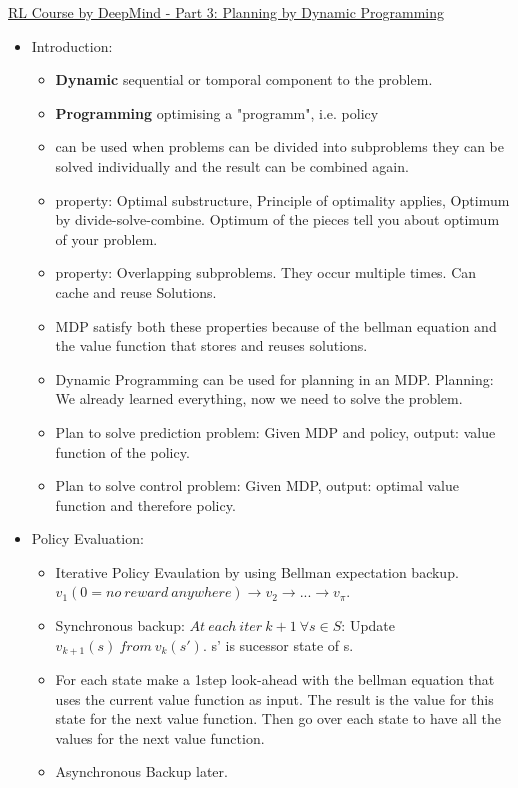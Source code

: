 \href{https://www.youtube.com/watch?v=Nd1-UUMVfz4}{RL Course by DeepMind - Part 3: Planning by Dynamic Programming}
\begin{itemize}[noitemsep,nolistsep]
	\item Introduction:
	\begin{itemize}[noitemsep,nolistsep]
		\item \textbf{Dynamic} sequential or tomporal component to the problem.
		\item \textbf{Programming} optimising a "programm", i.e. policy
		\item can be used when problems can be divided into subproblems they can be solved individually and the result can be combined again.
		\item property: Optimal substructure, Principle of optimality applies, Optimum by divide-solve-combine. Optimum of the pieces tell you about optimum of your problem.
		\item property: Overlapping subproblems. They occur multiple times. Can cache and reuse Solutions.
		\item MDP satisfy both these properties because of the bellman equation and the value function that stores and reuses solutions.
		\item Dynamic Programming can be used for planning in an MDP. Planning: We already learned everything, now we need to solve the problem.
		\item Plan to solve prediction problem: Given MDP and policy, output: value function of the policy.
		\item Plan to solve control problem: Given MDP, output: optimal value function and therefore policy.
	\end{itemize}
	\item Policy Evaluation:
	\begin{itemize}[noitemsep,nolistsep]
		\item Iterative Policy Evaulation by using Bellman expectation backup. $v_1 (0 = no\ reward\ anywhere) \rightarrow v_2 \rightarrow ... \rightarrow v_\pi$.
		\item Synchronous backup: $At\ each\ iter\ k+1\ \forall s \in S$: Update $v_{k+1}(s)\ from\ v_k(s')$. s' is sucessor state of s.
		\item For each state make a 1step look-ahead with the bellman equation that uses the current value function as input. The result is the value for this state for the next value function. Then go over each state to have all the values for the next value function.
		\item Asynchronous Backup later.

\end{itemize}
\end{itemize}
